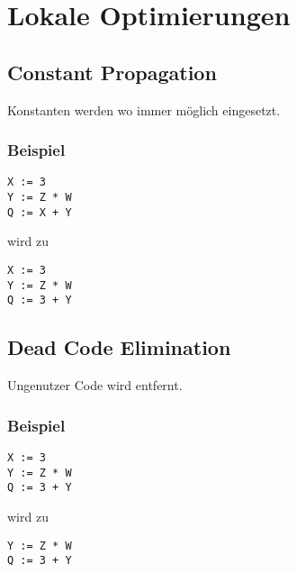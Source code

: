 \section{Lokale Optimierungen}

\subsection{Constant Propagation}

Konstanten werden wo immer möglich eingesetzt.

\subsubsection*{Beispiel}

\begin{verbatim}
X := 3
Y := Z * W
Q := X + Y
\end{verbatim}

wird zu

\begin{verbatim}
X := 3
Y := Z * W
Q := 3 + Y
\end{verbatim}

\subsection{Dead Code Elimination}

Ungenutzer Code wird entfernt.

\subsubsection*{Beispiel}

\begin{verbatim}
X := 3
Y := Z * W
Q := 3 + Y
\end{verbatim}

wird zu

\begin{verbatim}
Y := Z * W
Q := 3 + Y
\end{verbatim}
